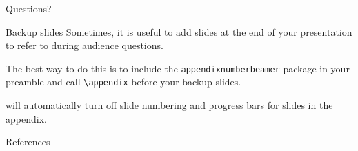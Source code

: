 \documentclass[10pt]{beamer}
\begin{document}
\begin{frame}[standout]
  Questions?
\end{frame}

\appendix

\begin{frame}[fragile]{Backup slides}
  Sometimes, it is useful to add slides at the end of your presentation to
  refer to during audience questions.

  The best way to do this is to include the \verb|appendixnumberbeamer|
  package in your preamble and call \verb|\appendix| before your backup slides.

  \themename will automatically turn off slide numbering and progress bars for
  slides in the appendix.
\end{frame}

\begin{frame}[allowframebreaks]{References}

  
  

\end{frame}
\end{document}
